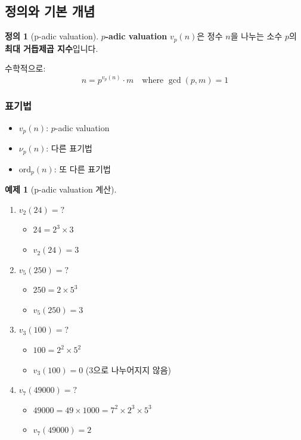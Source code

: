 \documentclass[11pt,a4paper]{article}
\theoremstyle{definition}
\newtheorem{definition}[theorem]{정의}
\newtheorem{example}[theorem]{예제}
\theoremstyle{remark}
\begin{document}
\subsection{정의와 기본 개념}

\begin{definition}[p-adic valuation]
\textbf{$p$-adic valuation} $v_p(n)$은 정수 $n$을 나누는 소수 $p$의 \textbf{최대 거듭제곱 지수}입니다.

수학적으로:
\[n = p^{v_p(n)} \cdot m \quad \text{where } \gcd(p, m) = 1\]
\end{definition}

\subsubsection{표기법}

\begin{itemize}
    \item $v_p(n)$: $p$-adic valuation
    \item $\nu_p(n)$: 다른 표기법
    \item $\text{ord}_p(n)$: 또 다른 표기법
\end{itemize}

\begin{example}[p-adic valuation 계산]
\begin{enumerate}
    \item $v_2(24) = ?$
    \begin{itemize}
        \item $24 = 2^3 \times 3$
        \item $v_2(24) = 3$
    \end{itemize}

    \item $v_5(250) = ?$
    \begin{itemize}
        \item $250 = 2 \times 5^3$
        \item $v_5(250) = 3$
    \end{itemize}

    \item $v_3(100) = ?$
    \begin{itemize}
        \item $100 = 2^2 \times 5^2$
        \item $v_3(100) = 0$ (3으로 나누어지지 않음)
    \end{itemize}

    \item $v_7(49000) = ?$
    \begin{itemize}
        \item $49000 = 49 \times 1000 = 7^2 \times 2^3 \times 5^3$
        \item $v_7(49000) = 2$
    \end{itemize}
\end{enumerate}
\end{example}
\end{document}

